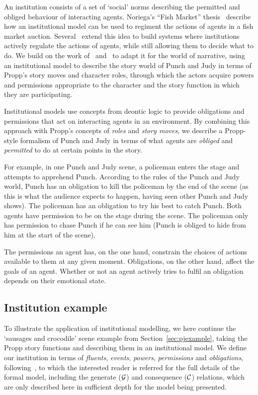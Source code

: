 \documentclass[11pt]{report}
\begin{document}
An institution consists of a set of `social' norms describing the permitted and obliged behaviour of interacting agents. Noriega's ``Fish Market'' thesis~\citep{noriega1999agent} describe how an institutional model can be used to regiment the actions of agents in a fish market auction. Several~\citep{artikis2009specifying,fornara2007agent,cardoso2007institutional} extend this idea to build systems where institutions actively regulate the actions of agents, while still allowing them to decide what to do. We build on the work of~\citet{cliffe2007specifying} and~\citet{lee2013decoupling} to adapt it for the world of narrative, using an institutional model to describe the story world of Punch and Judy in terms of Propp's story moves and character roles, through which the actors acquire powers and permissions appropriate to the character and the story function in which they are participating.

Institutional models use concepts from deontic logic to provide obligations and permissions that act on interacting agents in an environment. By combining this approach with Propp's concepts of \emph{roles} and \emph{story moves}, we describe a Propp-style formalism of Punch and Judy in terms of what agents are \emph{obliged} and \emph{permitted} to do at certain points in the story.

For example, in one Punch and Judy scene, a policeman enters the stage and attempts to apprehend Punch. According to the rules of the Punch and Judy world, Punch has an obligation to kill the policeman by the end of the scene (as this is what the audience expects to happen, having seen other Punch and Judy shows). The policeman has an obligation to try his best to catch Punch. Both agents have permission to be on the stage during the scene. The policeman only has permission to chase Punch if he can see him (Punch is obliged to hide from him at the start of the scene).

The permissions an agent has, on the one hand, constrain the choices of actions available to them at any given moment. Obligations, on the other hand, affect the goals of an agent. Whether or not an agent actively tries to fulfil an obligation depends on their emotional state.

\subsection{Institution example}
\label{sec:pjexample-insts}
To illustrate the application of institutional modelling, we here continue the `sausages and crocodile' scene example from Section~\ref{sec:pjexample}, taking the Propp story functions and describing them in an institutional model.  We define our institution in terms of \emph{fluents}, \emph{events}, \emph{powers}, \emph{permissions} and \emph{obligations}, following~\citet{cliffe2007specifying}, to which the interested reader is referred for the full details of the formal model, including the generate ($\cal G$) and consequence ($\cal C$) relations, which are only described here in sufficient depth for the model being presented.
\end{document}
